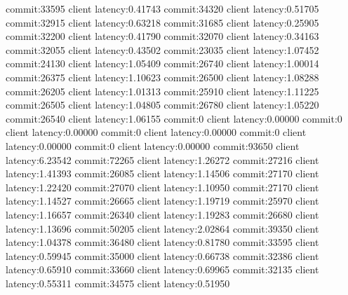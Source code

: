 commit:33595 client latency:0.41743
commit:34320 client latency:0.51705
commit:32915 client latency:0.63218
commit:31685 client latency:0.25905
commit:32200 client latency:0.41790
commit:32070 client latency:0.34163
commit:32055 client latency:0.43502
commit:23035 client latency:1.07452
commit:24130 client latency:1.05409
commit:26740 client latency:1.00014
commit:26375 client latency:1.10623
commit:26500 client latency:1.08288
commit:26205 client latency:1.01313
commit:25910 client latency:1.11225
commit:26505 client latency:1.04805
commit:26780 client latency:1.05220
commit:26540 client latency:1.06155
commit:0 client latency:0.00000
commit:0 client latency:0.00000
commit:0 client latency:0.00000
commit:0 client latency:0.00000
commit:0 client latency:0.00000
commit:93650 client latency:6.23542
commit:72265 client latency:1.26272
commit:27216 client latency:1.41393
commit:26085 client latency:1.14506
commit:27170 client latency:1.22420
commit:27070 client latency:1.10950
commit:27170 client latency:1.14527
commit:26665 client latency:1.19719
commit:25970 client latency:1.16657
commit:26340 client latency:1.19283
commit:26680 client latency:1.13696
commit:50205 client latency:2.02864
commit:39350 client latency:1.04378
commit:36480 client latency:0.81780
commit:33595 client latency:0.59945
commit:35000 client latency:0.66738
commit:32386 client latency:0.65910
commit:33660 client latency:0.69965
commit:32135 client latency:0.55311
commit:34575 client latency:0.51950

